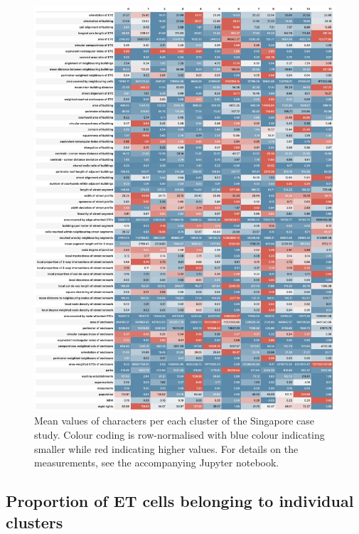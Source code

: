 \begin{figure}
  \includegraphics[width=\linewidth]{figures/singapore_means.png}
  \caption{Mean values of characters per each cluster of the Singapore case study.
  Colour coding is row-normalised with blue colour indicating smaller while red indicating
  higher values. For details on the measurements, see the accompanying Jupyter notebook.
  }
  \label{fig:means_sin}
\end{figure}

\subsection{Proportion of ET cells belonging to individual clusters}


